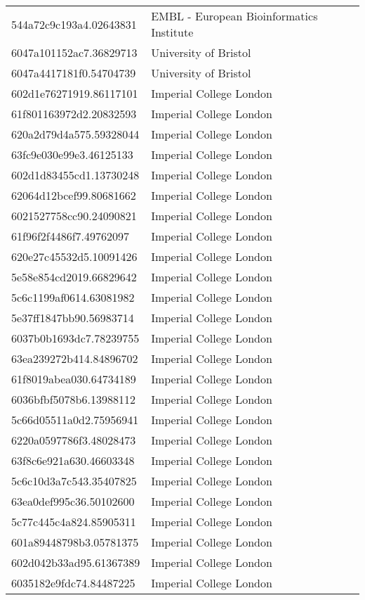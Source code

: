 \begin{tabular}{ll}
544a72c9c193a4.02643831 & EMBL - European Bioinformatics Institute \\
6047a101152ac7.36829713 & University of Bristol \\
6047a4417181f0.54704739 & University of Bristol \\
602d1e76271919.86117101 & Imperial College London \\
61f801163972d2.20832593 & Imperial College London \\
620a2d79d4a575.59328044 & Imperial College London \\
63fc9e030e99e3.46125133 & Imperial College London \\
602d1d83455cd1.13730248 & Imperial College London \\
62064d12bcef99.80681662 & Imperial College London \\
6021527758cc90.24090821 & Imperial College London \\
61f96f2f4486f7.49762097 & Imperial College London \\
620e27c45532d5.10091426 & Imperial College London \\
5e58e854cd2019.66829642 & Imperial College London \\
5c6c1199af0614.63081982 & Imperial College London \\
5e37ff1847bb90.56983714 & Imperial College London \\
6037b0b1693dc7.78239755 & Imperial College London \\
63ea239272b414.84896702 & Imperial College London \\
61f8019abea030.64734189 & Imperial College London \\
6036bfbf5078b6.13988112 & Imperial College London \\
5c66d05511a0d2.75956941 & Imperial College London \\
6220a0597786f3.48028473 & Imperial College London \\
63f8c6e921a630.46603348 & Imperial College London \\
5c6c10d3a7c543.35407825 & Imperial College London \\
63ea0def995c36.50102600 & Imperial College London \\
5c77c445c4a824.85905311 & Imperial College London \\
601a89448798b3.05781375 & Imperial College London \\
602d042b33ad95.61367389 & Imperial College London \\
6035182e9fdc74.84487225 & Imperial College London \\

\end{tabular}
